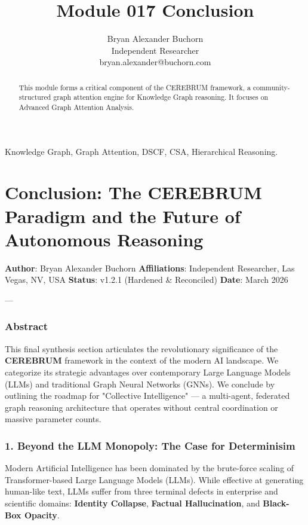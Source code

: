 \documentclass[10pt,journal,compsoc]{IEEEtran}
\begin{document}
\title{Module 017 Conclusion}
\author{Bryan Alexander Buchorn \\ Independent Researcher \\ bryan.alexander@buchorn.com}

\maketitle

\begin{abstract}
This module forms a critical component of the CEREBRUM framework, a community-structured graph attention engine for Knowledge Graph reasoning. It focuses on Advanced Graph Attention Analysis.
\end{abstract}

\begin{IEEEkeywords}
Knowledge Graph, Graph Attention, DSCF, CSA, Hierarchical Reasoning.
\end{IEEEkeywords}

\section{Conclusion: The CEREBRUM Paradigm and the Future of Autonomous Reasoning}

\textbf{Author}: Bryan Alexander Buchorn  
\textbf{Affili\-ations}: Independent Researcher, Las Vegas, NV, USA  
\textbf{Status}: v1.2.1 (Hardened \& Reconciled)  
\textbf{Date}: March 2026

---

\subsubsection{Abstract}
This final synthesis section articulates the revol\-utionary signi\-ficance of the \textbf{CEREBRUM} framework in the context of the modern AI landscape. We categorize its strategic advantages over conte\-mporary Large Language Models (LLMs) and traditional Graph Neural Networks (GNNs). We conclude by outlining the roadmap for "Collective Intell\-igence" — a multi-agent, federated graph reasoning archi\-tecture that operates without central coord\-ination or massive parameter counts.

\subsubsection{1. Beyond the LLM Monopoly: The Case for Determ\-inisim}
Modern Artificial Intell\-igence has been dominated by the brute-force scaling of Transformer-based Large Language Models (LLMs). While effective at generating human-like text, LLMs suffer from three terminal defects in enterprise and scientific domains: \textbf{Identity Collapse}, \textbf{Factual Halluc\-ination}, and \textbf{Black-Box Opacity}. 
\end{document}
